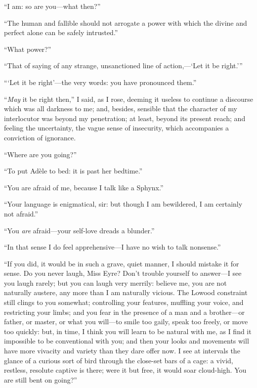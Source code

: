 \enquote{I am: so are you---what then?}

\enquote{The human and fallible should not arrogate a power with which
	the divine and perfect alone can be safely intrusted.}

\enquote{What power?}

\enquote{That of saying of any strange, unsanctioned line of
	action,---\enquote{Let it be right.}}

\enquote{\enquote{Let it be right}---the very words: you have
	pronounced them.}

\enquote{\emph{May} it be right then,} I said, as I rose, deeming it useless
to continue a discourse which was all darkness to me; and, besides,
sensible that the character of my interlocutor was beyond my
penetration; at least, beyond its present reach; and feeling the
uncertainty, the vague sense of insecurity, which accompanies a
conviction of ignorance.

\enquote{Where are you going?}

\enquote{To put Adèle to bed: it is past her bedtime.}

\enquote{You are afraid of me, because I talk like a Sphynx.}

\enquote{Your language is enigmatical, sir: but though I am bewildered,
	I am certainly not afraid.}

\enquote{You \emph{are} afraid---your self-love dreads a blunder.}

\enquote{In that sense I do feel apprehensive---I have no wish to talk
	nonsense.}

\enquote{If you did, it would be in such a grave, quiet manner, I should
	mistake it for sense. Do you never laugh, Miss Eyre? Don't trouble
	yourself to answer---I see you laugh rarely; but you can laugh very
	merrily: believe me, you are not naturally austere, any more than I am
	naturally vicious. The Lowood constraint still clings to you somewhat;
	controlling your features, muffling your voice, and restricting your
	limbs; and you fear in the presence of a man and a brother---or father,
	or master, or what you will---to smile too gaily, speak too freely, or
	move too quickly: but, in time, I think you will learn to be natural
	with me, as I find it impossible to be conventional with you; and then
	your looks and movements will have more vivacity and variety than they
	dare offer now. I see at intervals the glance of a curious sort of bird
	through the close-set bars of a cage: a vivid, restless, resolute
	captive is there; were it but free, it would soar cloud-high. You are
	still bent on going?}


